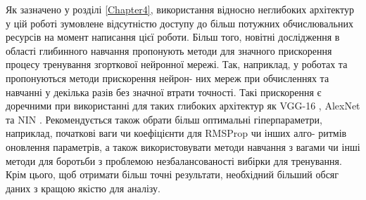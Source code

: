 Як зазначено у розділі \ref{Chapter4}, використання відносно неглибоких архітектур у цій роботі зумовлене відсутністю доступу до більш потужних обчислювальних ресурсів на момент написання цієї роботи. Більш того, новітні дослідження в області глибинного навчання пропонують методи для значного прискорення процесу тренування згорткової нейронної мережі. Так, наприклад, у роботах \citep{nn:perforated} та \citep{nn:acceleration} пропонуються методи прискорення нейрон- них мереж при обчисленнях та навчанні у декілька разів без значної втрати точності. Такі прискорення є доречними при використанні для таких глибоких архітектур як VGG-16 \citep{nn:vgg}, AlexNet \citep{nn:krizhevsky_imagenet} та NIN \citep{nn:nin}. Рекомендується також обрати більш оптимальні гіперпараметри, наприклад, початкові ваги чи коефіцієнти для RMSProp чи інших алго- ритмів оновлення параметрів, а також використовувати методи навчання з вагами \citep{nn:imbalance} чи інші методи для боротьби з проблемою незбалансованості вибірки для тренування. Крім цього, щоб отримати більш точні результати, необхідний більший обсяг даних з кращою якістю для аналізу.